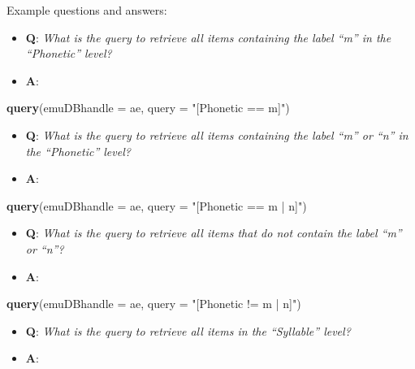 \documentclass[]{book}
\newenvironment{Shaded}{\begin{snugshade}}{\end{snugshade}}
\newcommand{\DataTypeTok}[1]{\textcolor[rgb]{0.13,0.29,0.53}{#1}}
\newcommand{\KeywordTok}[1]{\textcolor[rgb]{0.13,0.29,0.53}{\textbf{#1}}}
\newcommand{\NormalTok}[1]{#1}
\newcommand{\StringTok}[1]{\textcolor[rgb]{0.31,0.60,0.02}{#1}}
\providecommand{\tightlist}{%
  \setlength{\itemsep}{0pt}\setlength{\parskip}{0pt}}
\begin{document}
Example questions and answers:

\begin{itemize}
\tightlist
\item
  \textbf{Q}: \emph{What is the query to retrieve all items containing the label ``m'' in the ``Phonetic'' level?}
\item
  \textbf{A}:
\end{itemize}

\begin{Shaded}
\begin{Highlighting}[]
\KeywordTok{query}\NormalTok{(}\DataTypeTok{emuDBhandle =}\NormalTok{ ae, }
      \DataTypeTok{query =} \StringTok{"[Phonetic == m]"}\NormalTok{)}
\end{Highlighting}
\end{Shaded}

\begin{itemize}
\tightlist
\item
  \textbf{Q}: \emph{What is the query to retrieve all items containing the label ``m'' or ``n'' in the ``Phonetic'' level?}
\item
  \textbf{A}:
\end{itemize}

\begin{Shaded}
\begin{Highlighting}[]
\KeywordTok{query}\NormalTok{(}\DataTypeTok{emuDBhandle =}\NormalTok{ ae, }
      \DataTypeTok{query =} \StringTok{"[Phonetic == m | n]"}\NormalTok{)}
\end{Highlighting}
\end{Shaded}

\begin{itemize}
\tightlist
\item
  \textbf{Q}: \emph{What is the query to retrieve all items that do not contain the label ``m'' or ``n''?}
\item
  \textbf{A}:
\end{itemize}

\begin{Shaded}
\begin{Highlighting}[]
\KeywordTok{query}\NormalTok{(}\DataTypeTok{emuDBhandle =}\NormalTok{ ae, }
      \DataTypeTok{query =} \StringTok{"[Phonetic != m | n]"}\NormalTok{)}
\end{Highlighting}
\end{Shaded}

\begin{itemize}
\tightlist
\item
  \textbf{Q}: \emph{What is the query to retrieve all items in the ``Syllable'' level?}
\item
  \textbf{A}:
\end{itemize}
\end{document}
